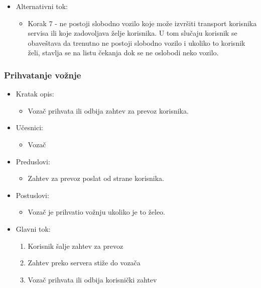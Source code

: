 \begin{itemize}
	\item Alternativni tok:
		\begin{itemize}
    		\item Korak 7 - ne postoji slobodno vozilo koje može izvršiti transport korisnika servisa ili koje zadovoljava želje korisnika. U tom slučaju 
		    korisnik se obaveštava da trenutno ne postoji slobodno  vozilo i ukoliko to korisnik želi, stavlja se na listu čekanja dok se ne oslobodi neko vozilo.
		\end{itemize}
\end{itemize}

\subsubsection{\bfseries Prihvatanje vožnje}
\begin{itemize}
	\item Kratak opis:
		\begin{itemize}
			\item Vozač prihvata ili odbija zahtev za prevoz korisnika.
		\end{itemize}
 
	\item Učesnici:
		\begin{itemize}
		    \item Vozač
		\end{itemize}				

	\item Preduslovi:
		\begin{itemize}
		    \item Zahtev za prevoz poslat od strane korisnika.
		\end{itemize}

	\item Postuslovi:
		\begin{itemize}
			\item Vozač je prihvatio vožnju ukoliko je to želeo.
		\end{itemize}		


	\item Glavni tok:
		\begin{enumerate}
		    \item Korisnik šalje zahtev za prevoz
		    \item Zahtev preko servera stiže do vozača
		    \item Vozač prihvata ili odbija korisnički zahtev
		\end{enumerate}
\end{itemize}

